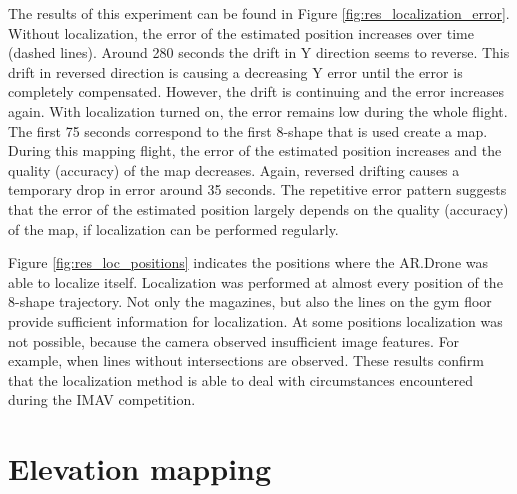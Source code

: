 The results of this experiment can be found in Figure \ref{fig:res_localization_error}.
Without localization, the error of the estimated position increases over time (dashed lines).
Around 280 seconds the drift in Y direction seems to reverse.
This drift in reversed direction is causing a decreasing Y error until the error is completely compensated.
However, the drift is continuing and the error increases again.
With localization turned on, the error remains low during the whole flight.
The first 75 seconds correspond to the first 8-shape that is used create a map.
During this mapping flight, the error of the estimated position increases and the quality (accuracy) of the map decreases.
Again, reversed drifting causes a temporary drop in error around 35 seconds.
The repetitive error pattern suggests that the error of the estimated position largely depends on the quality (accuracy) of the map, if localization can be performed regularly.

Figure \ref{fig:res_loc_positions} indicates the positions where the AR.Drone was able to localize itself.
Localization was performed at almost every position of the 8-shape trajectory.
Not only the magazines, but also the lines on the gym floor provide sufficient information for localization.
At some positions localization was not possible, because the camera observed insufficient image features.
For example, when lines without intersections are observed.
These results confirm that the localization method is able to deal with circumstances encountered during the IMAV competition.


	\section{Elevation mapping}